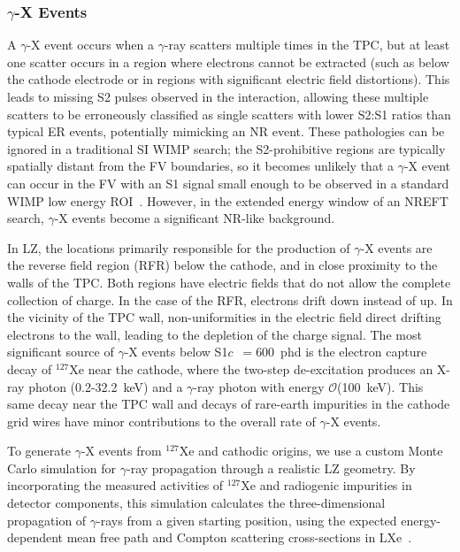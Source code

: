 \documentclass[reprint, showpacs,
preprintnumbers,
amsmath,amssymb,
aps, floatfix,
superscriptaddress,
prd, nofootinbib]{revtex4-1}
\begin{document}
\subsubsection{\label{subsec:mssi}$\gamma$-X Events}
\par
A $\gamma$-X event occurs when a $\gamma$-ray scatters multiple times in the TPC, but at least one scatter occurs in a region where electrons cannot be extracted (such as below the cathode electrode or in regions with significant electric field distortions).
This leads to missing S2 pulses observed in the interaction, allowing these multiple scatters to be erroneously classified as single scatters with lower S2:S1 ratios than typical ER events, potentially mimicking an NR event. 
These pathologies can be ignored in a traditional SI WIMP search; the S2-prohibitive regions are typically spatially distant from the FV boundaries, so it becomes unlikely that a $\gamma$-X event can occur in the FV with an S1 signal small enough to be observed in a standard WIMP low energy ROI~\cite{LZ:SR1WS_2022}. 
However, in the extended energy window of an NREFT search, $\gamma$-X events become a significant NR-like background.
\par
In LZ, the locations primarily responsible for the production of $\gamma$-X events are the reverse field region (RFR) below the cathode, and in close proximity to the walls of the TPC.
Both regions have electric fields that do not allow the complete collection of charge.
In the case of the RFR, electrons drift down instead of up.
In the vicinity of the TPC wall, non-uniformities in the electric field direct drifting electrons to the wall, leading to the depletion of the charge signal.
The most significant source of $\gamma$-X events below S1$c$~$=600$~phd is the electron capture decay of $^{127}$Xe near the cathode, where the two-step de-excitation produces an X-ray photon (0.2-32.2~keV) and a $\gamma$-ray photon with energy $\mathcal{O}$(100~keV).
This same decay near the TPC wall and decays of rare-earth impurities in the cathode grid wires have minor contributions to the overall rate of $\gamma$-X events. 
\par
To generate $\gamma$-X events from $^{127}$Xe and cathodic origins, we use a custom Monte Carlo simulation for $\gamma$-ray propagation through a realistic LZ geometry.
By incorporating the measured activities of ${}^{127}$Xe and radiogenic impurities in detector components, this simulation calculates the three-dimensional propagation of $\gamma$-rays from a given starting position, using the expected energy-dependent mean free path and Compton scattering cross-sections in LXe~\cite{weinberg1995quantum, berger1998xcom}. 
\end{document}

